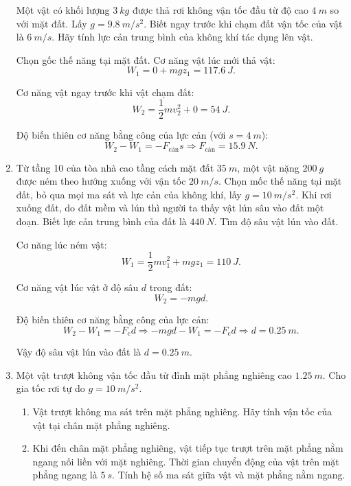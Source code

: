 \begin{enumerate}[label=\bfseries Câu \arabic*:]
	
	{
		Một vật có khối lượng $\SI{3}{kg}$ được thả rơi không vận tốc đầu từ độ cao $\SI{4}{m}$ so với mặt đất. Lấy $g=\SI{9.8}{m/s^2}$. Biết ngay trước khi chạm đất vận tốc của vật là $\SI{6}{m/s}$. Hãy tính lực cản trung bình của không khí tác dụng lên vật.
	}
	
	\hideall
	{	
		Chọn gốc thế năng tại mặt đất. Cơ năng vật lúc mới thả vật:
		$$W_1 = 0 + mgz_1 = \SI{117.6}{J}.$$
		
		Cơ năng vật ngay trước khi vật chạm đất:
		$$W_2 = \dfrac{1}{2}mv_2^2 + 0 = \SI{54}{J}.$$
		
		Độ biến thiên cơ năng bằng công của lực cản (với $s=\SI{4}{m}$):
		$$W_2 - W_1 = -F_\text{cản} s \Rightarrow F_\text{cản} = \SI{15.9}{N}.$$
	}
	\item {}
	
	
	{
		Từ tầng 10 của tòa nhà cao tầng cách mặt đất $\SI{35}{m}$, một vật nặng $\SI{200}{g}$ được ném theo hướng xuống với vận tốc $\SI{20}{m/s}$. Chọn mốc thế năng tại mặt đất, bỏ qua mọi ma sát và lực cản của không khí, lấy $g=\SI{10}{m/s^2}$. Khi rơi xuống đất, do đất mềm và lún thì người ta thấy vật lún sâu vào đất một đoạn. Biết lực cản trung bình của đất là $\SI{440}{N}$. Tìm độ sâu vật lún vào đất.
	}
	
	\hideall
	{	
		Cơ năng lúc ném vật:
		$$W_1 = \dfrac{1}{2}mv_1^2 + mgz_1 = \SI{110}{J}.$$
		
		Cơ năng vật lúc vật ở độ sâu $d$ trong đất:
		$$W_2 = -mgd.$$
		
		Độ biến thiên cơ năng bằng công của lực cản:
		$$W_2 - W_1 = -F_\text{c} d \Rightarrow -mgd - W_1 = -F_\text{c} d \Rightarrow d = \SI{0.25}{m}.$$
		
		Vậy độ sâu vật lún vào đất là $d=\SI{0.25}{m}$.
	}
		\item {}
	
	
	{
		Một vật trượt không vận tốc đầu từ đỉnh mặt phẳng nghiêng cao $\SI{1.25}{m}$. Cho gia tốc rơi tự do $g=\SI{10}{m/s^2}$.
		\begin{enumerate}[label=\alph*)]
			\item Vật trượt không ma sát trên mặt phẳng nghiêng. Hãy tính vận tốc của vật tại chân mặt phẳng nghiêng.
			\item Khi đến chân mặt phẳng nghiêng, vật tiếp tục trượt trên mặt phẳng nằm ngang nối liền với mặt nghiêng. Thời gian chuyển động của vật trên mặt phẳng ngang là $\SI{5}{s}$. Tính hệ số ma sát giữa vật và mặt phẳng nằm ngang.
		\end{enumerate}
	}
	

\end{enumerate}

